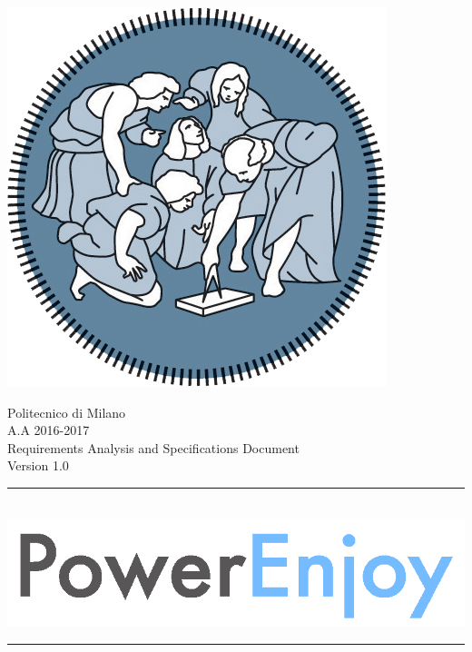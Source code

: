 \documentclass[12pt]{article}
\begin{document}
		 
	 \begin{center}
 	 	\includegraphics[scale=1.5]{Images/PolimiLogo.png}
	 \end{center}

	 \begin{center}
	 	{\Huge Politecnico di Milano}\\
	 	\vspace{5mm}
		{\Large A.A 2016-2017} 
		\vspace{5mm}\\
		{\huge Requirements Analysis and Specifications Document}   
		\vspace{5mm}\\
		{\large Version 1.0}  
     \end{center}
     
     \begin{center}
		\noindent\rule{8cm}{0.8pt}
		 \vspace{5mm}\\
 	 	 \includegraphics[scale=1]{Images/logoPowerEnjoy2.png}\\
		\noindent\rule{8cm}{0.8pt}
	 \end{center}
	 	\vspace{5mm}
	
\end{document}
